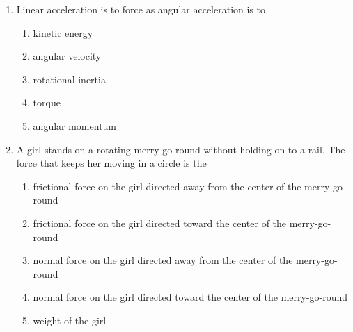 \documentclass{../../oss-apphys}
\begin{document}
\genheader


\genmultidirections

\gengravity

\raggedcolumns
\begin{multicols}{2}
%
%
%
%
%
%
%
%
  \begin{enumerate}[leftmargin=18pt]

  \item Linear acceleration is to force as angular acceleration is to
    \begin{enumerate}[noitemsep,topsep=0pt]
    \item kinetic energy
    \item angular velocity
    \item rotational inertia
    \item torque
    \item angular momentum
    \end{enumerate}

  \item A girl stands on a rotating merry-go-round without holding on to a rail.
    The force that keeps her moving in a circle is the
    \begin{enumerate}[noitemsep,topsep=0pt]
    \item frictional force on the girl directed away from the center of the
      merry-go-round
    \item frictional force on the girl directed toward the center of the
      merry-go-round
    \item normal force on the girl directed away from the center of the
      merry-go-round
    \item normal force on the girl directed toward the center of the
      merry-go-round
    \item weight of the girl
    \end{enumerate}


\end{enumerate}
\end{multicols}
\end{document}
